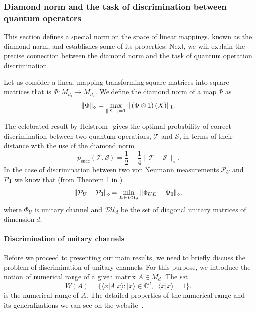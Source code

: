 \documentclass[preprint,12pt, a4paper]{elsarticle}
\newcommand{\ket}[1]{\ensuremath{|#1\rangle}}
\newcommand{\bra}[1]{\ensuremath{\langle#1|}}
\newcommand{\braket}[2]{\ensuremath{\langle{#1}|{#2}\rangle}}
\newcommand{\1}{{\rm 1\hspace{-0.9mm}l}}
\newcommand{\Id}{{\rm 1\hspace{-0.9mm}l}}
\newcommand{\TT}{\mathcal{T}}
\newcommand{\PP}{\mathcal{P}}
\renewcommand{\SS}{\mathcal{S}}
\newcommand{\diaguni}{\ensuremath{\mathcal{DU}}}
\begin{document}
\subsubsection{Diamond norm and the task of discrimination between quantum operators}
This section defines a special norm on the space of linear mappings, known as 
the diamond norm, and establishes some of its properties. 
Next, we will explain the precise connection between the diamond
norm and the task of quantum operation discrimination. 

Let us  consider a  linear mapping transforming  square matrices into square 
matrices that is $\Phi: M_{d_1} \to M_{d_2}$. 
We define the diamond norm of a map $\Phi$ as 
\begin{equation}
\|\Phi\|_\diamond = \max_{\|X\|_1=1} \| \left(\Phi \otimes \1\right) (X) \|_1.
\end{equation}





The celebrated result by Helstrom~\cite{helstrom1976quantum} gives the optimal  probability of correct discrimination between two quantum operations, $\TT$  and $\SS$, 
in terms of their distance with the use of the diamond norm
\begin{equation}
p_{\text{succ}}(\TT, \SS) =  \frac12 + \frac14 \| \TT - \SS \|_\diamond.
\end{equation}
In the case of discrimination between two von Neumann measurements $\PP_U$ and 
$\PP_\Id$ we know that (from Theorem 1 in \cite{puchala2018strategies})
\begin{equation}
\|\PP_U - \PP_\Id\|_\diamond = \min_{E \in \diaguni_d} \|\Phi_{UE} - 
\Phi_\Id\|_\diamond,
\end{equation}
where $\Phi_U$ is unitary channel and $\diaguni_d$ be the set of diagonal 
unitary matrices of dimension $d$. 



\paragraph{Discrimination of unitary channels}

Before we proceed to presenting our main results, we need to briefly discuss the
problem of discrimination of unitary channels.  For this purpose, we introduce the notion of numerical range of
a given matrix $A \in M_d$. The set \begin{equation}
W(A) =\{\bra{x}A\ket{x}: \ket{x} \in 
\mathbb{C}^d, \;
\;\braket{x}{x}=1\}.
\end{equation}   
is the numerical range of $A$.
The detailed properties of the numerical range and its generalizations we can see on the website~\cite{nr}. 
\end{document}
